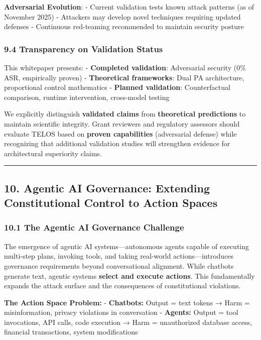 \textbf{Adversarial Evolution}: - Current validation tests known attack
patterns (as of November 2025) - Attackers may develop novel techniques
requiring updated defenses - Continuous red-teaming recommended to
maintain security posture

\subsubsection{9.4 Transparency on Validation
Status}\label{transparency-on-validation-status}

This whitepaper presents: - \textbf{Completed validation}: Adversarial
security (0\% ASR, empirically proven) - \textbf{Theoretical
frameworks}: Dual PA architecture, proportional control mathematics -
\textbf{Planned validation}: Counterfactual comparison, runtime
intervention, cross-model testing

We explicitly distinguish \textbf{validated claims} from
\textbf{theoretical predictions} to maintain scientific integrity. Grant
reviewers and regulatory assessors should evaluate TELOS based on
\textbf{proven capabilities} (adversarial defense) while recognizing
that additional validation studies will strengthen evidence for
architectural superiority claims.

\begin{center}\rule{0.5\linewidth}{0.5pt}\end{center}

\subsection{10. Agentic AI Governance: Extending Constitutional Control
to Action
Spaces}\label{agentic-ai-governance-extending-constitutional-control-to-action-spaces}

\subsubsection{10.1 The Agentic AI Governance
Challenge}\label{the-agentic-ai-governance-challenge}

The emergence of agentic AI systems---autonomous agents capable of
executing multi-step plans, invoking tools, and taking real-world
actions---introduces governance requirements beyond conversational
alignment. While chatbots generate text, agentic systems \textbf{select
and execute actions}. This fundamentally expands the attack surface and
the consequences of constitutional violations.

\textbf{The Action Space Problem:} - \textbf{Chatbots:} Output = text
tokens → Harm = misinformation, privacy violations in conversation -
\textbf{Agents:} Output = tool invocations, API calls, code execution →
Harm = unauthorized database access, financial transactions, system
modifications


